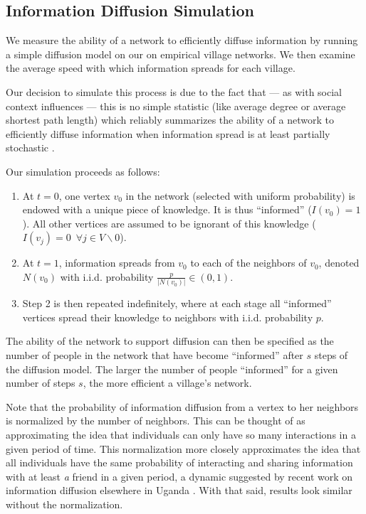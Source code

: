 \documentclass[12pt]{article}
\begin{document}
\begin{appendix}
\section{Information Diffusion Simulation}\label{appendix_diffusion_model}
We measure the ability of a network to efficiently diffuse information by running a simple diffusion model on our on empirical village networks. We then examine the average speed with which information spreads for each village.

Our decision to simulate this process is due to the fact that --- as with social context influences --- this is no simple statistic (like average degree or average shortest path length) which reliably summarizes the ability of a network to efficiently diffuse information when information spread is at least partially stochastic \citep[p. 19-35]{Newman:jyb}.

Our simulation proceeds as follows:
\begin{enumerate}
	\item At $t=0$, one vertex $v_0$ in the network (selected with uniform probability) is endowed with a unique piece of knowledge. It is thus ``informed'' ($I(v_0) = 1$). All other vertices are assumed to be ignorant of this knowledge ($I(v_j) = 0 \,\,\, \forall j\in V\backslash 0$).
	\item At $t=1$, information spreads from $v_0$ to each of the neighbors of $v_0$, denoted $N(v_0)$ with i.i.d. probability $\frac{p}{|N(v_0)|} \in(0,1)$.
	\item Step 2 is then repeated indefinitely, where at each stage all ``informed'' vertices spread their knowledge to neighbors with i.i.d. probability $p$.
\end{enumerate}

The ability of the network to support diffusion can then be specified as the number of people in the network that have become ``informed'' after $s$ steps of the diffusion model. The larger the number of people ``informed'' for a given number of steps $s$, the more efficient a village's network.

Note that the probability of information diffusion from a vertex to her neighbors is normalized by the number of neighbors. This can be thought of as approximating the idea that individuals can only have so many interactions in a given period of time. This normalization more closely approximates the idea that all individuals have the same probability of interacting and sharing information with at least \emph{a} friend in a given period, a dynamic suggested by recent work on information diffusion elsewhere in Uganda \citep{Larson:2016uz}. With that said, results look similar without the normalization.




\end{appendix}
\end{document}
